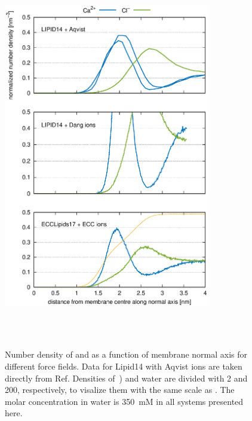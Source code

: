 \documentclass[aip,jcp,twocolumn]{revtex4}
\begin{document}
\begin{figure}[tbp]
  \centering
  \includegraphics[width=9.0cm,angle=0]{../Fig/CAdensities2.eps}
  \caption{\label{fig:cacl-dens}
    Number density of  and  as a function of membrane normal axis
    for different force fields. Data for Lipid14 with Aqvist ions are taken directly from Ref. 
    Densities of~) and water are divided with 2 and 200, respectively, to visalize them
    with the same scale as . The molar concentration in water is 350~mM in all systems
    presented here. 
    }
   \\
   \\
\end{figure}
\end{document}
